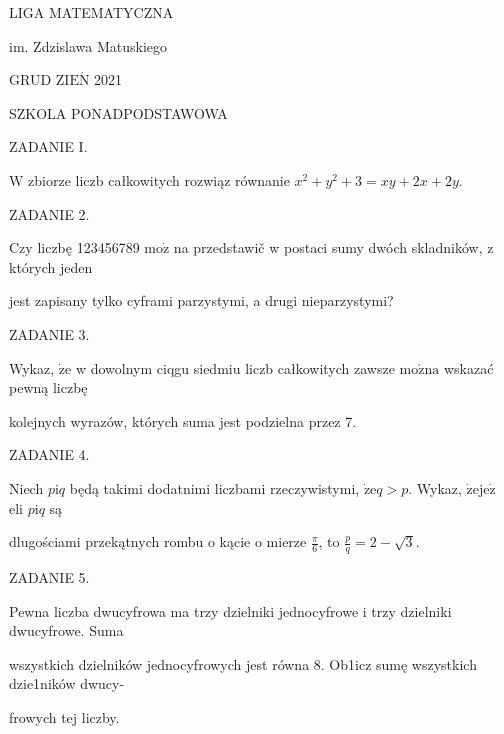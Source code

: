 \documentclass[a4paper,12pt]{article}
\begin{document}
LIGA MATEMATYCZNA

im. Zdzislawa Matuskiego

GRUD Z$\mathrm{I}\mathrm{E}\acute{\mathrm{N}}$ 2021

SZKOLA PONADPODSTAWOWA

ZADANIE I.

$\mathrm{W}$ zbiorze liczb całkowitych rozwiąz równanie $x^{2}+y^{2}+3=xy+2x+2y.$

ZADANIE 2.

Czy liczbę 123456789 $\mathrm{m}\mathrm{o}\dot{\mathrm{z}}$ na przedstawič w postaci sumy dwóch skladników, z których jeden

jest zapisany tylko cyframi parzystymi, a drugi nieparzystymi?

ZADANIE 3.

Wykaz, $\dot{\mathrm{z}}\mathrm{e}$ w dowolnym ciqgu siedmiu liczb całkowitych zawsze $\mathrm{m}\mathrm{o}\acute{\mathrm{z}}\mathrm{n}\mathrm{a}$ wskazać pewną liczbę

kolejnych wyrazów, których suma jest podzielna przez 7.

ZADANIE 4.

Niech $p\mathrm{i}q$ będą takimi dodatnimi liczbami rzeczywistymi, $\dot{\mathrm{z}}\mathrm{e}q>p$. Wykaz, $\dot{\mathrm{z}}\mathrm{e}\mathrm{j}\mathrm{e}\dot{\mathrm{z}}$ eli $p\mathrm{i}q$ są

dlugościami przekątnych rombu o kącie o mierze $\displaystyle \frac{\pi}{6}$, to $\displaystyle \frac{p}{q}=2-\sqrt{3}.$

ZADANIE 5.

Pewna liczba dwucyfrowa ma trzy dzielniki jednocyfrowe i trzy dzielniki dwucyfrowe. Suma

wszystkich dzielników jednocyfrowych jest równa 8. Ob1icz sumę wszystkich dzie1ników dwucy-

frowych tej liczby.
\end{document}
